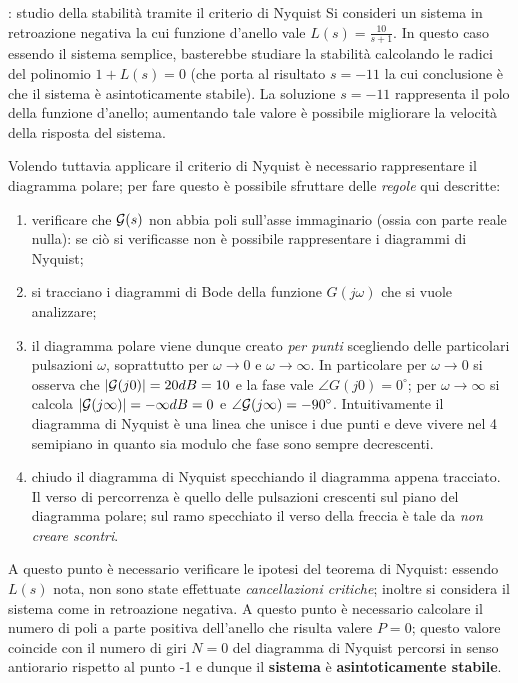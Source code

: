 	
	\begin{esempio}{: studio della stabilità tramite il criterio di Nyquist}
		Si consideri un sistema in retroazione negativa la cui funzione d'anello vale  $L(s) = \frac{10}{s+1}$. In questo caso essendo il sistema semplice, basterebbe studiare la stabilità calcolando le radici del polinomio $1 + L(s) = 0$ (che porta al risultato $s=-11$ la cui conclusione è che il sistema è asintoticamente stabile). La soluzione $s=-11$ rappresenta il polo della funzione d'anello; aumentando tale valore è possibile migliorare la velocità della risposta del sistema.
		
		Volendo tuttavia applicare il criterio di Nyquist è necessario rappresentare il diagramma polare; per fare questo è possibile sfruttare delle \textit{regole} qui descritte:
		\begin{enumerate}
			\item verificare che $\mathcal G(s)$ non abbia poli sull'asse immaginario (ossia con parte reale nulla): se ciò si verificasse non è possibile rappresentare i diagrammi di Nyquist;
			\item si tracciano i diagrammi di Bode della funzione $G(j\omega)$ che si vuole analizzare;
			\item il diagramma polare viene dunque creato \textit{per punti} scegliendo delle particolari pulsazioni $\omega$, soprattutto per $\omega\rightarrow 0$ e $\omega\rightarrow \infty$. In particolare per $\omega\rightarrow 0$ si osserva che $|\mathcal G(j0)| = 20dB = 10$ e la fase vale $\angle G(j0) = 0^\circ$; per $\omega \rightarrow \infty$ si calcola $|\mathcal G(j\infty)| = -\infty dB = 0$ e $\angle \mathcal G(j\infty) = -90^\circ$. Intuitivamente il diagramma di Nyquist è una linea che unisce i due punti e deve vivere nel 4 semipiano in quanto sia modulo che fase sono sempre decrescenti.
			\item chiudo il diagramma di Nyquist specchiando il diagramma appena tracciato. Il verso di percorrenza è quello delle pulsazioni crescenti sul piano del diagramma polare; sul ramo specchiato il verso della freccia è tale da \textit{non creare scontri}.
		\end{enumerate}
		
		A questo punto è necessario verificare le ipotesi del teorema di Nyquist: essendo $L(s)$ nota, non sono state effettuate \textit{cancellazioni critiche}; inoltre si considera il sistema come in retroazione negativa. A questo punto è necessario calcolare il numero di poli a parte positiva dell'anello che risulta valere $P=0$; questo valore coincide con il numero di giri $N=0$ del diagramma di Nyquist percorsi in senso antiorario rispetto al punto -1 e dunque il \textbf{sistema} è \textbf{asintoticamente stabile}.
	
		\end{esempio}
		
